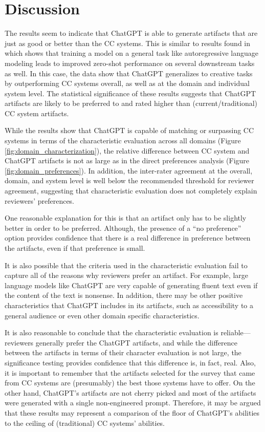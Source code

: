 \documentclass[phd,electronic,oneside,twosidetoc,letterpaper,chaptercenter,parttop,lof]{byumsphd}
\begin{document}
\section{Discussion}

The results seem to indicate that ChatGPT is able to generate artifacts that are just as good or better than the CC systems.  This is similar to results found in \cite{radford2018gpt2} which shows that training a model on a general task like autoregressive language modeling leads to improved zero-shot performance on several downstream tasks as well.
In this case, the data show that ChatGPT generalizes to creative tasks by outperforming CC systems overall, as well as at the domain and individual system level.
The statistical significance of these results suggests that ChatGPT artifacts are likely to be preferred to and rated higher than (current/traditional) CC system artifacts.

While the results show that ChatGPT is capable of matching or surpassing CC systems in terms of the characteristic evaluation across all domains (Figure \ref{fig:domain_characterization}), the relative difference between CC system and ChatGPT artifacts is not as large as in the direct preferences analysis (Figure \ref{fig:domain_preferences}). 
In addition, the inter-rater agreement at the overall, domain, and system level is well below the recommended threshold for reviewer agreement, suggesting that characteristic evaluation does not completely explain reviewers' preferences.

One reasonable explanation for this is that an artifact only has to be slightly better in order to be preferred.
Although, the presence of a ``no preference'' option provides confidence that there is a real difference in preference between the artifacts, even if that preference is small. 

It is also possible that the criteria used in the characteristic evaluation fail to capture all of the reasons why reviewers prefer an artifact. 
For example, large language models like ChatGPT are very capable of generating fluent text even if the content of the text is nonsense. 
In addition, there may be other positive characteristics that ChatGPT includes in its artifacts, such as accessibility to a general audience or even other domain specific characteristics. 

It is also reasonable to conclude that the characteristic evaluation is reliable---reviewers generally prefer the ChatGPT artifacts, and while the difference between the artifacts in terms of their character evaluation is not large, the significance testing provides confidence that this difference is, in fact, real.
Also, it is important to remember that the artifacts selected for the survey that came from CC systems are (presumably) the best those systems have to offer.
On the other hand, ChatGPT's artifacts are not cherry picked and most of the artifacts were generated with a single non-engineered prompt. 
Therefore, it may be argued that these results may represent a comparison of the floor of ChatGPT's abilities to the ceiling of (traditional) CC systems' abilities.  
\end{document}
